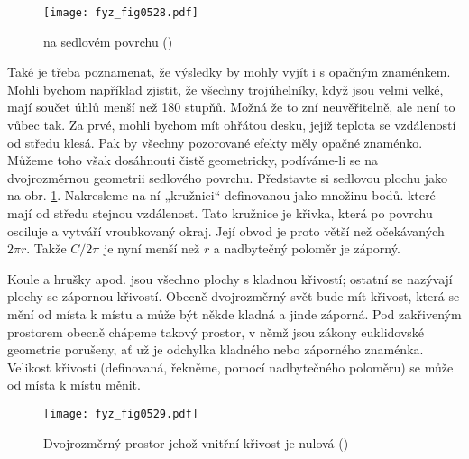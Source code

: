     \begin{figure}[ht!] %
      \centering
      \texttt{[image: fyz\_fig0528.pdf]}
      \caption{ na sedlovém povrchu
               (\cite[s.~780]{Feynman02})}
      \label{fyz:fig0528}
    \end{figure}
  
    Také je třeba poznamenat, že výsledky by mohly vyjít i s opačným znaménkem. Mohli bychom 
    například zjistit, že všechny trojúhelníky, když jsou velmi velké, mají součet úhlů menší než 
    \num{180} stupňů. Možná že to zní neuvěřitelně, ale není to vůbec tak. Za prvé, mohli bychom 
    mít ohřátou desku, jejíž teplota se vzdáleností od středu klesá. Pak by všechny pozorované 
    efekty měly opačné znaménko. Můžeme toho však dosáhnouti čistě geometricky, podíváme-li se na 
    dvojrozměrnou geometrii sedlového povrchu. Představte si sedlovou plochu jako na obr. 
    \ref{fyz:fig0528}. Nakresleme na ní „kružnici“ definovanou jako množinu bodů. které mají od 
    středu stejnou vzdálenost. Tato kružnice je křivka, která po povrchu osciluje a vytváří 
    vroubkovaný okraj. Její obvod je proto větší než očekávaných \(2\pi r\). Takže \(C/2\pi\) je 
    nyní menší než \(r\) a nadbytečný  poloměr je záporný. 
    
    Koule a hrušky apod. jsou všechno plochy s kladnou křivostí; ostatní se nazývají plochy se 
    zápornou křivostí. Obecně dvojrozměrný svět bude mít křivost, která se mění od místa k místu a 
    může být někde kladná a jinde záporná. Pod zakřiveným prostorem obecně chápeme takový prostor, 
    v němž jsou zákony euklidovské geometrie porušeny, ať už je odchylka kladného nebo záporného 
    znaménka. Velikost křivosti (definovaná, řekněme, pomocí nadbytečného poloměru) se může od 
    místa k místu měnit.

    \begin{figure}[ht!] %
      \centering
      \texttt{[image: fyz\_fig0529.pdf]}
      \caption{Dvojrozměrný prostor jehož vnitřní křivost je nulová
               (\cite[s.~781]{Feynman02})}
      \label{fyz:fig0529}
    \end{figure}
  

